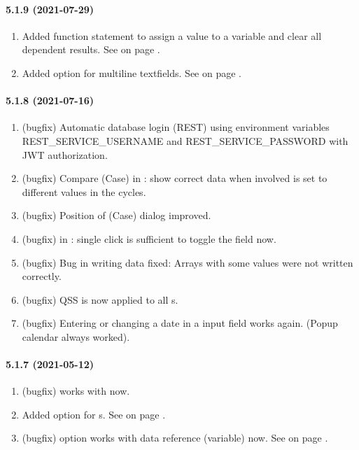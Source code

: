\paragraph{5.1.9 (2021-07-29)}  %
\begin{enumerate}
\item Added function statement \ASSIGNCONSISTENCY{} to assign a value to a variable and clear all dependent results.
      See  on page \pageref{dia:datastatement}.
\item Added option \AUTOSCROLL{} for multiline textfields.
      See  on page \pageref{dia:uifieldadditionalattributes}.
\end{enumerate}

\paragraph{5.1.8 (2021-07-16)}  %
\begin{enumerate}
\item (bugfix) Automatic database login (REST) using environment variables REST\_SERVICE\_USERNAME
      and REST\_SERVICE\_PASSWORD with JWT authorization.
\item (bugfix) Compare \CYCLE{} (Case) in \PLOTTWOD{}: show correct data when
      involved \INDEX{} is set to different values in the cycles.
\item (bugfix) Position of \CYCLE{} (Case) dialog improved.
\item (bugfix) \TOGGLE{} in \TABLE: single click is sufficient to toggle the field now.
\item (bugfix) Bug in writing \JSON{} data fixed:
      Arrays with some \INVALID{} values were not written correctly.
\item (bugfix) QSS is now applied to all \FORM{}s.
\item (bugfix) Entering or changing a date in a \STRINGDATE{} input field works again.
      (Popup calendar always worked).
\end{enumerate}

\paragraph{5.1.7 (2021-05-12)}  %
\begin{enumerate}
\item (bugfix) \DATASETTEXT{} works with \INDEXEDSET{} now.
\item Added option \INDENT{} for \JSON{} \STREAM{}s.
      See  on page \pageref{dia:stjsonoptions}.
\item (bugfix) \PLOTTWOD{} option \ASPECTRATIO{} works with data reference (variable) now.
      See  on page \pageref{dia:uiplot2dxaxisoptions}.
\end{enumerate}

